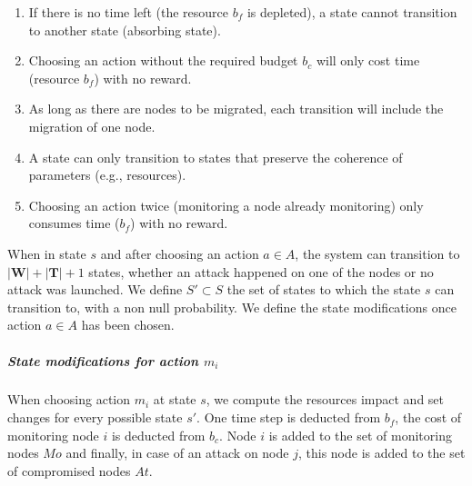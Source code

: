 \begin{enumerate}
    \item If there is no time left (\ie the resource $b_f$ is depleted), a state cannot transition to another state (absorbing state).
    \label{cond:c1}
    \item Choosing an action without the required budget $b_c$ will only cost time (resource $b_f$) with no reward.
    \label{cond:c2}
    \item As long as there are nodes to be migrated, each transition will include the migration of one node.
    \label{cond:c3}
    \item A state can only transition to states that preserve the coherence of parameters (e.g., resources).
    \label{cond:c4}
    \item Choosing an action twice (\ie monitoring a node already monitoring) only consumes time ($b_f$) with no reward.
    \label{cond:c6}
 \end{enumerate}


When in state $s$ and after choosing an action $a \in A$, the system can transition to $|\textbf{W}|+|\textbf{T}| + 1 $ states, whether an attack happened on one of the nodes or no attack was launched.
We define $S' \subset S$ the set of states to which the state $s$ can transition to, with a non null probability.
We define the state modifications once action $a \in A$ has been chosen.

\subparagraph*{\textbf{State modifications for action $m_i$}}
When choosing action $m_i$ at state $s$, we compute the resources impact and set changes for every possible state $s'$. One time step is deducted from $b_f$, the cost of monitoring node $i$ is deducted from $b_c$. Node $i$ is added to the set of monitoring nodes $Mo$ and finally, in case of an attack on node $j$, this node is added to the set of compromised nodes $At$.

